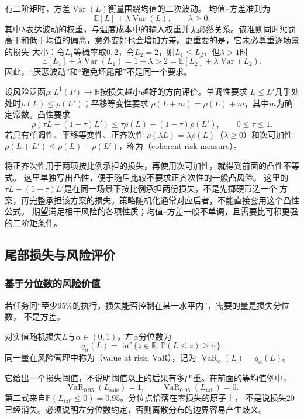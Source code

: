 有二阶矩时，方差$\operatorname{Var}(L)$衡量围绕均值的二次波动。
均值--方差准则为
\[
  \mathbb E[L]+\lambda\operatorname{Var}(L),\qquad \lambda\geq0.
\]
其中$\lambda$表达波动的权重，与温度成本中的输入权重并无必然关系。该准则同时惩罚
高于和低于均值的偏离，意外变好也会增加方差。更重要的是，它未必尊重逐场景的损失
大小：令$L_1$等概率取$0,2$，令$L_2=2$，则$L_1\leq L_2$，但$\lambda>1$时
\[
  \mathbb E[L_1]+\lambda\operatorname{Var}(L_1)=1+\lambda>2
  =\mathbb E[L_2]+\lambda\operatorname{Var}(L_2).
\]
因此，“厌恶波动”和“避免坏尾部”不是同一个要求。

\begin{definition}[相干风险]
\label{def:decision-coherent-risk}
设风险泛函$\rho:L^1(P)\to\mathbb R$按损失越小越好的方向评价。单调性要求
$L\leq L'$几乎处处时$\rho(L)\leq\rho(L')$；平移等变性要求
$\rho(L+m)=\rho(L)+m$，其中$m$为确定常数。凸性要求
\[
  \rho(\tau L+(1-\tau)L')
  \leq\tau\rho(L)+(1-\tau)\rho(L'),\qquad 0\leq\tau\leq1.
\]
若具有单调性、平移等变性、正齐次性
$\rho(\lambda L)=\lambda\rho(L)$（$\lambda\geq0$）和次可加性
$\rho(L+L')\leq\rho(L)+\rho(L')$，称为（coherent risk measure）。
\end{definition}

将正齐次性用于两项按比例承担的损失，再使用次可加性，就得到前面的凸性不等式。
这里单独写出凸性，便于随后比较不要求正齐次性的一般凸风险。
这里的$\tau L+(1-\tau)L'$是在同一场景下按比例承担两份损失，不是先掷硬币选一个
方案，再完整承担该方案的损失。策略随机化通常对应后者，不能直接套用这个凸性公式。
期望满足相干风险的各项性质；均值--方差一般不单调，且需要比可积更强的二阶矩条件。

\subsection{尾部损失与风险评价}

\subsubsection{基于分位数的风险价值}

若任务问“至少$95\%$的执行，损失能否控制在某一水平内”，需要的量是损失分位数，
不是方差。
\begin{definition}[风险价值]
\label{def:decision-value-at-risk}
对实值随机损失$L$与$\alpha\in(0,1)$，左$\alpha$分位数为
\begin{equation}
  q_\alpha(L)=\inf\{z\in\mathbb R:\mathbb P(L\leq z)\geq\alpha\}.
  \label{eq:decision-loss-quantile}
\end{equation}
同一量在风险管理中称为（value at risk, VaR），记为
$\operatorname{VaR}_\alpha(L)=q_\alpha(L)$。
\end{definition}
它给出一个损失阈值，不说明阈值以上的后果有多严重。在前面的等均值例中，
\[
  \operatorname{VaR}_{0.95}(L_{\mathrm{safe}})=1,\qquad
  \operatorname{VaR}_{0.95}(L_{\mathrm{tail}})=0.
\]
第二式来自$\mathbb P(L_{\mathrm{tail}}\leq0)=0.95$。分位点恰落在零损失的原子上，
不是说损失$20$已经消失。必须说明左分位数约定，否则离散分布的边界容易产生歧义。

